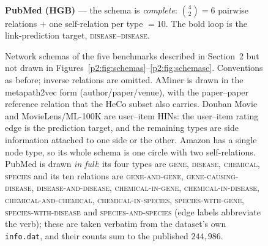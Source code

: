 \begin{figure}[htbp]
\vspace{14pt}
\begin{minipage}{\textwidth}\centering
{}
\\[4pt]{\small\textbf{PubMed (HGB)} --- the schema is \emph{complete}:
$\binom{4}{2}=6$ pairwise relations $+$ one self-relation per type $=10$.
The bold loop is the link-prediction target, \textsc{disease}--\textsc{disease}.}
\end{minipage}
\caption{Network schemas of the five benchmarks described in Section~2 but not drawn in
Figures~\ref{p2:fig:schemas}--\ref{p2:fig:schemasc}. Conventions as before; inverse relations are
omitted. AMiner is drawn in the \mbox{metapath2vec} form (author/paper/venue), with the
paper--paper reference relation that the HeCo subset also carries. Douban Movie and
MovieLens/ML-100K are user--item HINs: the user--item rating edge is the prediction target, and
the remaining types are side information attached to one side or the other. Amazon has a single
node type, so its whole schema is one circle with two self-relations. PubMed is drawn
\emph{in full}: its four types are \textsc{gene}, \textsc{disease}, \textsc{chemical},
\textsc{species} and its ten relations are \textsc{gene-and-gene},
\textsc{gene-causing-disease}, \textsc{disease-and-disease}, \textsc{chemical-in-gene},
\textsc{chemical-in-disease}, \textsc{chemical-and-chemical}, \textsc{chemical-in-species},
\textsc{species-with-gene}, \textsc{species-with-disease} and \textsc{species-and-species}
(edge labels abbreviate the verb); these are taken verbatim from the dataset's own
\texttt{info.dat}, and their counts sum to the published $244{,}986$.}
\label{p2:fig:schemasd}
\end{figure}
